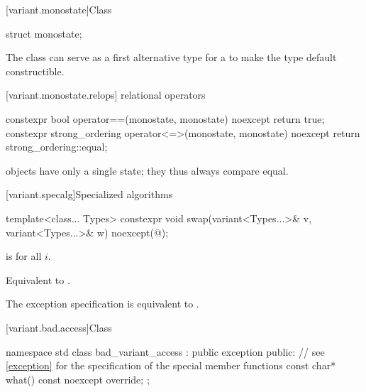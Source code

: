 [variant.monostate]{Class }%
%

\begin{itemdecl}
struct monostate{};
\end{itemdecl}

\begin{itemdescr}
\pnum
The class  can serve as a first alternative type for
a  to make the  type default constructible.
\end{itemdescr}


[variant.monostate.relops]{ relational operators}

%
%
\begin{itemdecl}
constexpr bool operator==(monostate, monostate) noexcept { return true; }
constexpr strong_ordering operator<=>(monostate, monostate) noexcept
{ return strong_ordering::equal; }
\end{itemdecl}

\begin{itemdescr}
\pnum
\begin{note}
 objects have only a single state; they thus always compare equal.
\end{note}
\end{itemdescr}

[variant.specalg]{Specialized algorithms}

%
\begin{itemdecl}
template<class... Types>
  constexpr void swap(variant<Types...>& v, variant<Types...>& w) noexcept(@\seebelow@);
\end{itemdecl}

\begin{itemdescr}
\pnum
\constraints
{}
is  for all $i$.

\pnum
\effects
Equivalent to .

\pnum
\remarks
The exception specification is equivalent to .
\end{itemdescr}

[variant.bad.access]{Class }%
%

\begin{codeblock}
namespace std {
  class bad_variant_access : public exception {
  public:
    // see \ref{exception} for the specification of the special member functions
    const char* what() const noexcept override;
  };
}
\end{codeblock}


